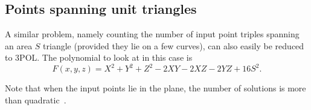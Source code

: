 \subsection{Points spanning unit triangles}

A similar problem, namely counting the number of input point triples spanning
an area $S$ triangle (provided they lie on a few curves), can also easily be
reduced to 3POL\@.
%
The polynomial to look at in this case is
\begin{displaymath}
	F(x,y,z) = X^2 + Y^2 + Z^2 - 2XY - 2XZ - 2YZ + 16 S^2.
\end{displaymath}

Note that when the input points lie in the plane, the number of solutions is
more than quadratic~\cite{RS15,RSS15b}.
